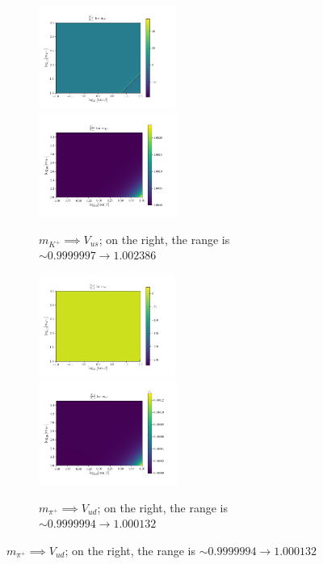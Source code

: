 \documentclass[11pt]{article}
\begin{document}
\begin{figure}[H]\ContinuedFloat
    \centering
    \begin{subfigure}[b]{\textwidth}
        \includegraphics[width=0.49\textwidth]{heatmaps/mK-rH0.png}
        \includegraphics[width=0.5\textwidth]{heatmaps/mK-rH1.png}
        \caption{$m_{K^+} \implies V_{us}$; on the right, the range is $\sim0.9999997\to1.002386$}
    \end{subfigure}
    \begin{subfigure}[b]{\textwidth}
        \includegraphics[width=0.49\textwidth]{heatmaps/mpi-rH0.png}
        \includegraphics[width=0.5\textwidth]{heatmaps/mpi-rH1.png}
        \caption{$m_{\pi^+} \implies V_{ud}$; on the right, the range is $\sim0.9999994\to1.000132$}
    \end{subfigure}
\end{figure}
\end{document}
